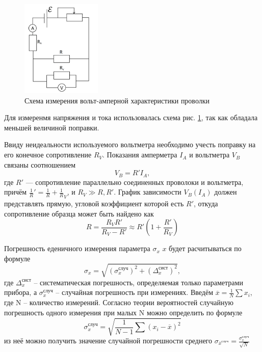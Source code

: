 \documentclass[12pt,a4paper]{article}
\begin{document}
\begin{figure}
\includegraphics[width=0.34\textwidth]{imgs/scheme.png}
\caption{Схема измерения вольт-амперной характеристики проволки}
\label{fig:scheme}
\end{figure}
Для измеренмя напряжения и тока использовалась схема рис. \ref{fig:scheme}, так как обладала меньшей величиной поправки.

Ввиду неидеальности используемого вольтметра необходимо
учесть поправку на его конечное сопротивление $R_V$.  Показания амперметра $I_A$ и вольтметра $V_B$ связаны соотношением
\begin{equation}\label{Vb_eq}
V_B = R'I_A,
\end{equation}
где $R'$ — сопротивление параллельно соединенных проволоки и
вольтметра, причём $\frac 1 R' = \frac 1 R + \frac 1 R_V$, и $R_V \gg R,R'$. График зависимости $V_B(I_A)$ должен представлять прямую, угловой коэффициент которой есть $R'$, откуда сопротивление образца может быть найдено как
\begin{equation} \label{R_eq}
R = \frac {R_V R'} {R_V-R'} \approx R'\left(1+\frac{R'}{R_V}\right)
\end{equation}


Погрешность еденичного измерения параметра $\sigma _x$ $x$ будет расчитываться по формуле
\begin{equation}
    \sigma _x = \sqrt{ (\sigma _x ^{случ})^2 + (\Delta _x ^{сист})^2},
\end{equation}
где $\Delta _x ^{сист}$ -- систематическая погрешность, определяемая только параметрами прибора, а $\sigma _x ^{случ}$ -- случайная погрешность при измерениях. Введём $\overline{x}=\frac{1}{N}\sum x_i$, где N -- количество измерений.  Согласно теории вероятностей случайную погрешность одного измерения при малых N можно определить по формуле
\begin{equation}
\sigma _x ^{случ} = \sqrt{\frac{1}{N-1} \sum \left( x_i - \overline{x} \right)^2}
\end{equation}
из неё можно получить значение случайной погрешности среднего $\sigma _{\overline{x} ^{случ}} = \frac{\sigma _x ^{случ}}{\sqrt{N}}$
\end{document}
